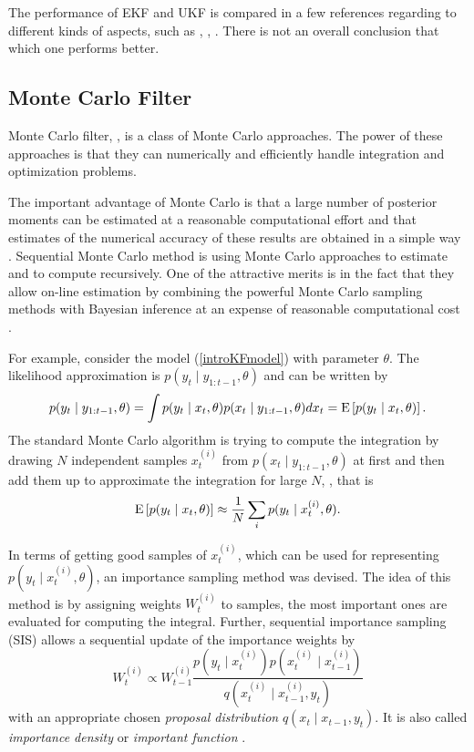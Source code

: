 The performance of EKF and UKF is compared in a few references regarding to different kinds of aspects, such as \cite{chandrasekar2007comparison}, \cite{laviola2003comparison}, \cite{st2004comparison}. There is not an overall conclusion that which one performs better. 





\subsection*{Monte Carlo Filter}


Monte Carlo filter, \cite{chen2003bayesian},  is a class of Monte Carlo approaches. The power of these approaches is that they can numerically and efficiently handle integration and optimization problems. 

The important advantage of Monte Carlo is that a large number of posterior moments can be estimated at a reasonable computational effort and that estimates of the numerical accuracy of these results are obtained in a simple way \cite{kloek1978bayesian}. Sequential Monte Carlo method is using Monte Carlo approaches to estimate and to compute recursively. One of the attractive merits is in the fact that they allow on-line estimation by combining the powerful Monte Carlo sampling methods with Bayesian inference at an expense of reasonable computational cost \cite{chen2003bayesian}. 


For example, consider the model (\ref{introKFmodel}) with parameter $\theta$. The likelihood approximation is $p(y_t\mid y_{1:t-1},\theta)$ and can be written by
\begin{equation*}
p(y_t\mid y_{1:t-1},\theta) = \int p(y_t\mid x_t,\theta)p(x_t\mid y_{1:t-1},\theta) dx_t = \mathrm{E} \left[p(y_t\mid x_t,\theta)\right].
\end{equation*}
The standard Monte Carlo algorithm is trying to compute the integration by drawing $N$ independent samples $x_t^{(i)}$ from $p(x_t\mid y_{1:t-1},\theta)$ at first and then add them up to approximate the integration for large $N$, \cite{kalos2008monte}, that is 
\begin{equation*}
\mathrm{E}\left[p(y_t\mid x_t,\theta)\right]\approx \frac{1}{N}\sum_i p(y_t\mid x_t^{(i)},\theta). 
\end{equation*}


In terms of getting good samples of $x_t^{(i)}$, which can be used for representing $p(y_t\mid x_t^{(i)},\theta)$, an importance sampling method was devised. The idea of this method is by assigning weights $W_t^{(i)}$ to samples, the most important ones are evaluated for computing the integral. Further, sequential importance sampling (SIS) allows a sequential update of the importance weights by 
\begin{equation*}
W_t^{(i)} \propto W_{t-1}^{(i)} \frac{ p(y_t \mid x_t^{(i)}) p(x_{t}^{(i)}\mid x_{t-1}^{(i)}) }{q(x_{t}^{(i)}\mid x_{t-1}^{(i)},y_{t})}
\end{equation*}
with an appropriate chosen \textit{proposal distribution} $q(x_{t}\mid  x_{t-1},y_{t})$. It is also called \textit{importance density} or \textit{important function} \cite{chen2003bayesian}. 


